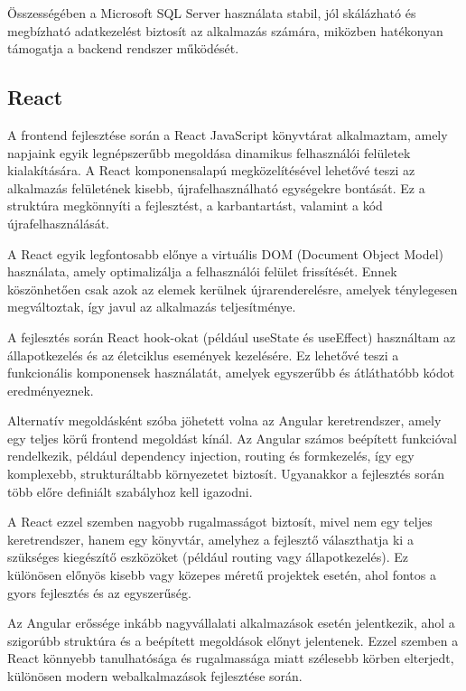 \documentclass[
]{thesis-ekf}
\theoremstyle{definition}
\theoremstyle{remark}
\begin{document}
Összességében a Microsoft SQL Server használata stabil, jól skálázható és megbízható adatkezelést biztosít az alkalmazás számára, miközben hatékonyan támogatja a backend rendszer működését.

\subsection{React}

A frontend fejlesztése során a React JavaScript könyvtárat alkalmaztam, amely napjaink egyik legnépszerűbb megoldása dinamikus felhasználói felületek kialakítására. A React komponensalapú megközelítésével lehetővé teszi az alkalmazás felületének kisebb, újrafelhasználható egységekre bontását. Ez a struktúra megkönnyíti a fejlesztést, a karbantartást, valamint a kód újrafelhasználását.

A React egyik legfontosabb előnye a virtuális DOM (Document Object Model) használata, amely optimalizálja a felhasználói felület frissítését. Ennek köszönhetően csak azok az elemek kerülnek újrarenderelésre, amelyek ténylegesen megváltoztak, így javul az alkalmazás teljesítménye.

A fejlesztés során React hook-okat (például useState és useEffect) használtam az állapotkezelés és az életciklus események kezelésére. Ez lehetővé teszi a funkcionális komponensek használatát, amelyek egyszerűbb és átláthatóbb kódot eredményeznek.

Alternatív megoldásként szóba jöhetett volna az Angular keretrendszer, amely egy teljes körű frontend megoldást kínál. Az Angular számos beépített funkcióval rendelkezik, például dependency injection, routing és formkezelés, így egy komplexebb, strukturáltabb környezetet biztosít. Ugyanakkor a fejlesztés során több előre definiált szabályhoz kell igazodni.

A React ezzel szemben nagyobb rugalmasságot biztosít, mivel nem egy teljes keretrendszer, hanem egy könyvtár, amelyhez a fejlesztő választhatja ki a szükséges kiegészítő eszközöket (például routing vagy állapotkezelés). Ez különösen előnyös kisebb vagy közepes méretű projektek esetén, ahol fontos a gyors fejlesztés és az egyszerűség.

Az Angular erőssége inkább nagyvállalati alkalmazások esetén jelentkezik, ahol a szigorúbb struktúra és a beépített megoldások előnyt jelentenek. Ezzel szemben a React könnyebb tanulhatósága és rugalmassága miatt szélesebb körben elterjedt, különösen modern webalkalmazások fejlesztése során.
\end{document}
